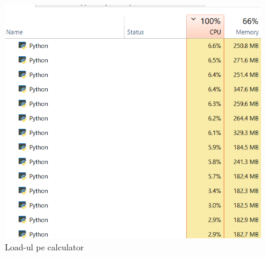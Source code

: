 \begin{figure}[h]
    \centering
    \includegraphics[width=0.7\linewidth]{task_manager.png}
    \caption{Load-ul pe calculator}
    \label{fig:enter-label}
\end{figure}